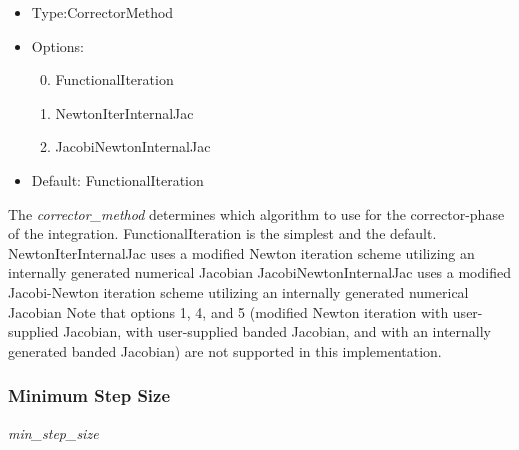\begin{itemize}
\item
Type:CorrectorMethod
\item
Options:
\begin{enumerate}
\setcounter{enumi}{-1}
\item
FunctionalIteration
\setcounter{enumi}{1}
\item
NewtonIterInternalJac
\item
JacobiNewtonInternalJac
\end{enumerate}
\item
Default: FunctionalIteration
\end{itemize}
The \textit{corrector\_method} determines which algorithm to use for the
corrector-phase of the integration.
FunctionalIteration is the simplest and the default.
NewtonIterInternalJac uses a modified Newton iteration scheme utilizing
an internally generated numerical Jacobian
JacobiNewtonInternalJac uses a modified Jacobi-Newton iteration scheme
utilizing an internally generated numerical Jacobian
Note that options 1, 4, and 5 (modified Newton iteration with user-supplied
Jacobian, with user-supplied banded Jacobian, and with an internally generated
banded Jacobian) are not supported in this implementation.



\subsubsection{Minimum Step Size}
\textit{min\_step\_size}

